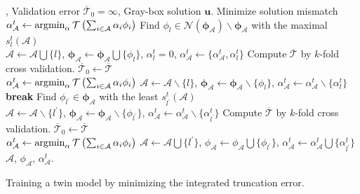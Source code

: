 \begin{algorithm}[H]
\begin{algorithmic}[1]
,
        Validation error $\overline{\mathcal{T}}_0 = \infty$,
        Gray-box solution $\boldsymbol{u}$.
\STATE Minimize solution mismatch 
       $
           \alpha^t_{\mathcal{A}} \leftarrow \operatorname*{\arg\!\min}_{\alpha} \mathcal{T}\left(\sum_{i \in \mathcal{A}} \alpha_i \phi_i\right)
       $ 
\LOOP 
\STATE Find $\phi_{l}\in \mathcal{N}(\boldsymbol{\phi}_{\mathcal{A}}) \backslash 
       \boldsymbol{\phi}_{\mathcal{A}}$ with the maximal $s_l^t(\mathcal{A})$ \\
       $\mathcal{A} \leftarrow 
       \mathcal{A} \bigcup \{l\}$, $\boldsymbol{\phi}_{\mathcal{A}} \leftarrow 
       \boldsymbol{\phi}_{\mathcal{A}}
       \bigcup \{\phi_{l}\}$, $\alpha^t_l = 0$,
       $\alpha^t_{\mathcal{A}} \leftarrow \{\alpha^t_{\mathcal{A}}, \alpha^t_l\}$
\STATE Compute $\overline{\mathcal{T}}$ by $k$-fold cross validation.
    \STATE $\overline{\mathcal{T}}_0\leftarrow \overline{\mathcal{T}}$\\
       $
           \alpha^t_{\mathcal{A}} \leftarrow \operatorname*{\arg\!\min}_{\alpha} \mathcal{T}\left(\sum_{i \in \mathcal{A}} \alpha_i \phi_i\right)
       $
\ELSE \STATE 
       $\mathcal{A} \leftarrow 
       \mathcal{A} \backslash \{l\}$, $\boldsymbol{\phi}_{\mathcal{A}} \leftarrow 
       \boldsymbol{\phi}_{\mathcal{A}}
       \backslash \{\phi_{l}\}$, $\alpha^t_{\mathcal{A}} \leftarrow \alpha^t_{\mathcal{A}} \backslash 
       \{\alpha^t_l\}$
      \textbf{break}
\ENDIF
\STATE Find $\phi_{l^\prime}\in 
       \boldsymbol{\phi}_{\mathcal{A}}$ with the least $s_{l^\prime}^t(\mathcal{A})$  \\
\STATE  
       $\mathcal{A} \leftarrow 
       \mathcal{A} \backslash \{l^\prime\}$,
       $\boldsymbol{\phi}_{\mathcal{A}} \leftarrow \boldsymbol{\phi}_{\mathcal{A}}
        \backslash\{\phi_{l^\prime}\}$, 
       $\alpha^t_{\mathcal{A}} \leftarrow \alpha^t_{\mathcal{A}}\backslash \{\alpha^t_{l^\prime}\}$
\STATE Compute $\overline{\mathcal{T}}$ by $k$-fold cross validation.
\STATE $\overline{\mathcal{T}}_0 \leftarrow \overline{\mathcal{T}}$\\
       $
           \alpha^t_{\mathcal{A}} \leftarrow \operatorname*{\arg\!\min}_{\alpha} \mathcal{T}\left(\sum_{i \in \mathcal{A}} \alpha_i \phi_i\right)
       $
\ELSE \STATE
       $\mathcal{A} \leftarrow \mathcal{A}\bigcup \{l^\prime\}$,
       $\phi_{\mathcal{A}}\leftarrow \phi_{\mathcal{A}} 
       \bigcup \{\phi_{l^\prime}\}$, $\alpha^t_{\mathcal{A}} \leftarrow 
       \alpha^t_{\mathcal{A}}\bigcup \{\alpha^t_{l^\prime}\}$
\ENDIF
\ENDIF
\ENDLOOP
\ENSURE $\mathcal{A}$, $\phi_{\mathcal{A}}$, $\alpha^t_{\mathcal{A}}$.
\end{algorithmic}
\caption{Training a twin model by minimizing the integrated truncation error.}
\label{alg: train twin trunc}
\end{algorithm}


